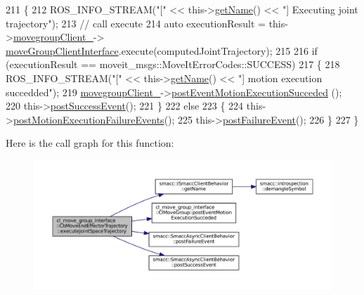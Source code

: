 \begin{DoxyCode}
211     \{
212         ROS\_INFO\_STREAM(\textcolor{stringliteral}{"["} << this->\hyperlink{classsmacc_1_1ISmaccClientBehavior_a18e4bec9460b010f2894c0f7e7064a34}{getName}() << \textcolor{stringliteral}{"] Executing joint trajectory"});
213         \textcolor{comment}{// call execute}
214         \textcolor{keyword}{auto} executionResult = this->\hyperlink{classcl__move__group__interface_1_1CbMoveEndEffectorTrajectory_aea650d3e7836125b32be97392b71a7f3}{movegroupClient\_}->
      \hyperlink{classcl__move__group__interface_1_1ClMoveGroup_a92922ea689e4e1b7b91512c56629c95b}{moveGroupClientInterface}.execute(computedJointTrajectory);
215 
216         \textcolor{keywordflow}{if} (executionResult == moveit\_msgs::MoveItErrorCodes::SUCCESS)
217         \{
218             ROS\_INFO\_STREAM(\textcolor{stringliteral}{"["} << this->\hyperlink{classsmacc_1_1ISmaccClientBehavior_a18e4bec9460b010f2894c0f7e7064a34}{getName}() << \textcolor{stringliteral}{"] motion execution succedded"});
219             \hyperlink{classcl__move__group__interface_1_1CbMoveEndEffectorTrajectory_aea650d3e7836125b32be97392b71a7f3}{movegroupClient\_}->\hyperlink{classcl__move__group__interface_1_1ClMoveGroup_aebaf269db373d41837bae87651458e54}{postEventMotionExecutionSucceded}
      ();
220             this->\hyperlink{classsmacc_1_1SmaccAsyncClientBehavior_adf18efe1f0e4eacc1277b8865a8a94b1}{postSuccessEvent}();
221         \}
222         \textcolor{keywordflow}{else}
223         \{
224             this->\hyperlink{classcl__move__group__interface_1_1CbMoveEndEffectorTrajectory_a72c4a469b70617dc5ea75e225a013582}{postMotionExecutionFailureEvents}();
225             this->\hyperlink{classsmacc_1_1SmaccAsyncClientBehavior_af6fa358cb1ab5ed16791a201f59260e0}{postFailureEvent}();
226         \}
227     \}
\end{DoxyCode}
Here is the call graph for this function\+:
\nopagebreak
\begin{figure}[H]
\begin{center}
\leavevmode
\includegraphics[width=350pt]{classcl__move__group__interface_1_1CbMoveEndEffectorTrajectory_a3a75fa185c62591e1869427650338a32_cgraph}
\end{center}
\end{figure}
